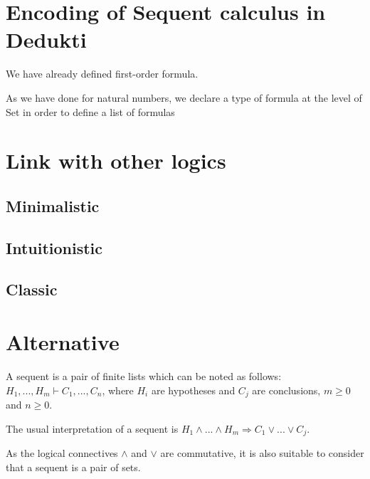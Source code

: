 \documentclass{article}
\begin{document}
\newpage
	
	\section{Encoding of Sequent calculus in Dedukti}
	
	We have already defined first-order formula.
	
	As we have done for natural numbers, we declare a type of formula at the level of Set in order to define a list of formulas
	
	
	
	
	
	
	
	
	
	
	
	\section{Link with other logics}
	
	\subsection{Minimalistic}
	
	\subsection{Intuitionistic}
	
	\subsection{Classic}
	
	
	\section{Alternative}
	
	A sequent is a pair of finite lists which can be noted as follows: $H_1,...,H_m \vdash C_1,...,C_n$, where $H_i$ are hypotheses and $C_j$ are conclusions, $m \ge 0$ and $n \ge 0$.
	
	The usual interpretation of a sequent is
	$H_1 \land ... \land H_m \Rightarrow C_1 \lor ... \lor C_j$.
	
	As the logical connectives $\land$ and $\lor$ are commutative, it is also suitable to consider that a sequent is a pair of sets.
	
\end{document}
